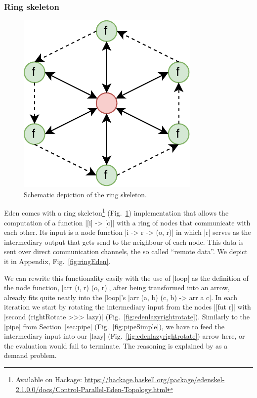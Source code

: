 \subsubsection{Ring skeleton} \label{sec:ring}
\begin{figure}[tb]
	\includegraphics[scale=0.75]{images/ring}
	\caption{Schematic depiction of the ring skeleton.}
	\label{fig:ringImg}
\end{figure}
Eden comes with a ring skeleton\footnote{Available on Hackage: \url{https://hackage.haskell.org/package/edenskel-2.1.0.0/docs/Control-Parallel-Eden-Topology.html}} (Fig.~\ref{fig:ringImg}) implementation that allows the computation of a function |[i] -> [o]| with a ring of nodes that communicate with each other. Its input is a node function |i -> r -> (o, r)| in which |r| serves as the intermediary output that gets send to the neighbour of each node. This data is sent over direct communication channels, the so called \enquote{remote data}. We depict it in Appendix, Fig.~\ref{fig:ringEden}.


We can rewrite this functionality easily with the use of |loop| as the definition of the node function, |arr (i, r) (o, r)|, after being transformed into an arrow, already fits quite neatly into the |loop|'s |arr (a, b) (c, b) -> arr a c|. In each iteration we start by rotating the intermediary input from the nodes |[fut r]| with |second (rightRotate >>> lazy)| (Fig.~\ref{fig:edenlazyrightrotate}). Similarly to the |pipe| from Section~\ref{sec:pipe} (Fig.~\ref{fig:pipeSimple}), we have to feed the intermediary input into our |lazy| (Fig.~\ref{fig:edenlazyrightrotate}) arrow here, or the evaluation would fail to terminate. The reasoning is explained by \citet{Loogen2012} as a demand problem.

